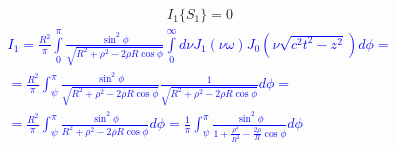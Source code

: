 %
\begin{equation*} \begin{aligned}
I_1 \{ S_1 \} = 0
\end{aligned} \end{equation*}
%
\textcolor{blue}{ \begin{equation*} \begin{aligned}
I_1 = \frac{R^2}{\pi} \int\limits_{0}^{\pi} 
\frac{\sin^2{\phi}}{\sqrt{R^2 + \rho^2 - 2 \rho R \cos \phi}}
\int\limits_{0}^{\infty} d \nu J_1 \left( \nu \omega \right) 
J_0 \left( \nu \sqrt{c^2 t^2 - z^2} \right) d \phi = \\
= \frac{R^2}{\pi} \int_{\psi}^{\pi}
\frac{\sin^2{\phi}}{\sqrt{R^2 + \rho^2 - 2 \rho R \cos \phi}}
\frac{1}{\sqrt{R^2 + \rho^2 - 2 \rho R \cos \phi}} d \phi = \\
= \frac{R^2}{\pi} \int_{\psi}^{\pi}
\frac{\sin^2{\phi}}{R^2 + \rho^2 - 2 \rho R \cos \phi} d \phi = 
\frac{1}{\pi} \int_{\psi}^{\pi}
\frac{\sin^2{\phi}}{1 + \frac{\rho^2}{R^2} - \frac{2 \rho}{R} \cos \phi} d \phi
\end{aligned} \end{equation*} }


